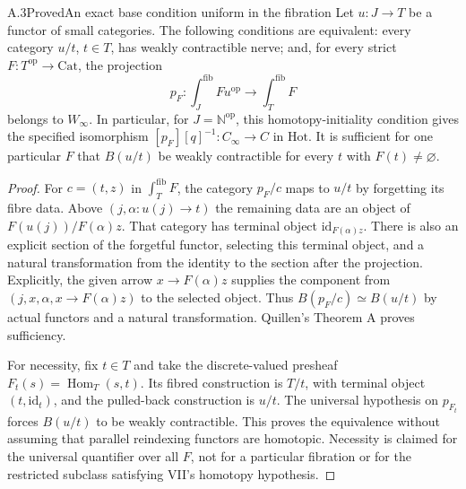 \begin{result}{A.3}{Proved}{An exact base condition uniform in the fibration}
Let $u:J\to T$ be a functor of small categories. The following
conditions are equivalent: every category $u/t$, $t\in T$, has weakly
contractible nerve; and, for every strict
$F:T^{\mathrm{op}}\to\mathrm{Cat}$, the projection
\[
 p_F:\int_J^{\mathrm{fib}}F u^{\mathrm{op}}
           \longrightarrow\int_T^{\mathrm{fib}}F
\]
belongs to $W_\infty$. In particular, for $J=\mathbb N^{\mathrm{op}}$,
this homotopy-initiality condition gives the specified isomorphism
$[p_F][q]^{-1}:C_\infty\to C$ in $\mathrm{Hot}$.
It is sufficient for one particular $F$ that $B(u/t)$ be weakly
contractible for every $t$ with $F(t)\ne\varnothing$.
\end{result}
\begin{proof}
For $c=(t,z)$ in $\int_T^{\mathrm{fib}}F$, the category $p_F/c$
maps to $u/t$ by forgetting its fibre data. Above $(j,\alpha:u(j)\to t)$
the remaining data are an object of
$F(u(j))/F(\alpha)z$. That category has terminal object
$\mathrm{id}_{F(\alpha)z}$. There is also an explicit section of the
forgetful functor, selecting this terminal object, and a natural
transformation from the identity to the section after the projection.
Explicitly, the given arrow $x\to F(\alpha)z$ supplies the
component from $(j,x,\alpha,x\to F(\alpha)z)$ to the selected object.
Thus $B(p_F/c)\simeq B(u/t)$ by actual functors and a natural
transformation. Quillen's Theorem A proves sufficiency.

For necessity, fix $t\in T$ and take the discrete-valued presheaf
$F_t(s)=\operatorname{Hom}_T(s,t)$. Its fibred construction is $T/t$,
with terminal object $(t,\mathrm{id}_t)$, and the pulled-back
construction is $u/t$. The universal hypothesis on $p_{F_t}$ forces
$B(u/t)$ to be weakly contractible. This proves the equivalence without
assuming that parallel reindexing functors are homotopic. Necessity is
claimed for the universal quantifier over all $F$, not for a particular
fibration or for the restricted subclass satisfying VII's homotopy
hypothesis.
\end{proof}

